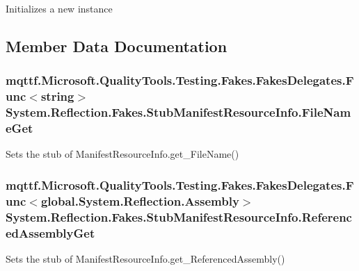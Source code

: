 Initializes a new instance



\subsection{Member Data Documentation}
\hypertarget{class_system_1_1_reflection_1_1_fakes_1_1_stub_manifest_resource_info_a2b682966507355d95a41db76caa103a1}{
\subsubsection[{File\-Name\-Get}]{\setlength{\rightskip}{0pt plus 5cm}mqttf.\-Microsoft.\-Quality\-Tools.\-Testing.\-Fakes.\-Fakes\-Delegates.\-Func$<$string$>$ System.\-Reflection.\-Fakes.\-Stub\-Manifest\-Resource\-Info.\-File\-Name\-Get}}\label{class_system_1_1_reflection_1_1_fakes_1_1_stub_manifest_resource_info_a2b682966507355d95a41db76caa103a1}


Sets the stub of Manifest\-Resource\-Info.\-get\-\_\-\-File\-Name()

\hypertarget{class_system_1_1_reflection_1_1_fakes_1_1_stub_manifest_resource_info_a6bfa3212b8077c2c225d0d89054f5683}{
\subsubsection[{Referenced\-Assembly\-Get}]{\setlength{\rightskip}{0pt plus 5cm}mqttf.\-Microsoft.\-Quality\-Tools.\-Testing.\-Fakes.\-Fakes\-Delegates.\-Func$<$global.\-System.\-Reflection.\-Assembly$>$ System.\-Reflection.\-Fakes.\-Stub\-Manifest\-Resource\-Info.\-Referenced\-Assembly\-Get}}\label{class_system_1_1_reflection_1_1_fakes_1_1_stub_manifest_resource_info_a6bfa3212b8077c2c225d0d89054f5683}


Sets the stub of Manifest\-Resource\-Info.\-get\-\_\-\-Referenced\-Assembly()

